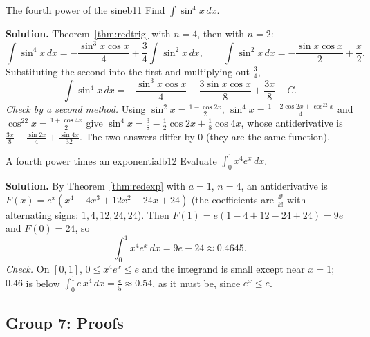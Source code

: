 \documentclass[11pt]{article}
\begin{document}
\begin{exmp}{The fourth power of the sine}{b11}
Find $\int\sin^4x\,dx$.

\textbf{Solution.} Theorem~\ref{thm:redtrig} with $n=4$, then with $n=2$:
\[\int\sin^4x\,dx=-\frac{\sin^3x\cos x}4+\frac34\int\sin^2x\,dx,\qquad\int\sin^2x\,dx=-\frac{\sin x\cos x}2+\frac x2 .\]
Substituting the second into the first and multiplying out $\frac34$,
\[\int\sin^4x\,dx=-\frac{\sin^3x\cos x}4-\frac{3\sin x\cos x}8+\frac{3x}8+C .\]
\emph{Check by a second method.} Using $\sin^2x=\frac{1-\cos2x}2$, $\sin^4x=\frac{1-2\cos2x+\cos^22x}4$ and $\cos^22x=\frac{1+\cos4x}2$ give $\sin^4x=\frac38-\frac12\cos2x+\frac18\cos4x$, whose antiderivative is $\frac{3x}8-\frac{\sin2x}4+\frac{\sin4x}{32}$. The two answers differ by $0$ (they are the same function).
\end{exmp}

\begin{exmp}{A fourth power times an exponential}{b12}
Evaluate $\int_0^1x^4e^x\,dx$.

\textbf{Solution.} By Theorem~\ref{thm:redexp} with $a=1$, $n=4$, an antiderivative is $F(x)=e^x\left(x^4-4x^3+12x^2-24x+24\right)$ (the coefficients are $\frac{4!}{k!}$ with alternating signs: $1,4,12,24,24$). Then $F(1)=e(1-4+12-24+24)=9e$ and $F(0)=24$, so
\[\int_0^1x^4e^x\,dx=9e-24\approx0.4645 .\]
\emph{Check.} On $[0,1]$, $0\le x^4e^x\le e$ and the integrand is small except near $x=1$; $0.46$ is below $\int_0^1e\,x^4\,dx=\frac e5\approx0.54$, as it must be, since $e^x\le e$.
\end{exmp}

\subsection*{Group 7: Proofs}
\end{document}
